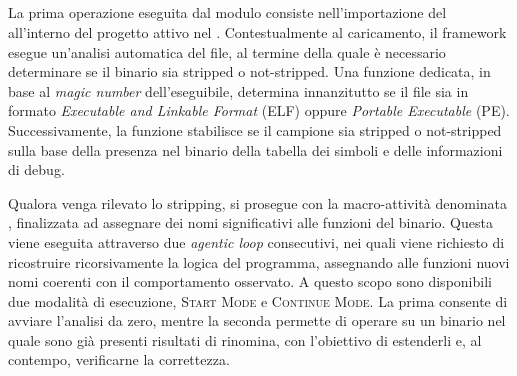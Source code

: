 \subsection{\sreagent{}} %

La prima operazione eseguita dal modulo consiste nell'importazione del \binary{} all'interno del progetto attivo nel \sreframework{}. Contestualmente al caricamento, il framework esegue un'analisi automatica del file, al termine della quale è necessario determinare se il binario sia stripped o not-stripped. Una funzione dedicata, in base al \emph{magic number} dell'eseguibile, determina innanzitutto se il file sia in formato \emph{Executable and Linkable Format} (ELF) oppure \emph{Portable Executable} (PE). Successivamente, la funzione stabilisce se il campione sia stripped o not-stripped sulla base della presenza nel binario della tabella dei simboli e delle informazioni di debug.



Qualora venga rilevato lo stripping, si prosegue con la macro-attività denominata \renaming{}, finalizzata ad assegnare dei nomi significativi alle funzioni del binario. Questa viene eseguita attraverso due \emph{agentic loop} consecutivi, nei quali viene richiesto di ricostruire ricorsivamente la logica del programma, assegnando alle funzioni nuovi nomi coerenti con il comportamento osservato. A questo scopo sono disponibili due modalità di esecuzione, \textsc{Start Mode} e \textsc{Continue Mode}. La prima consente di avviare l'analisi da zero, mentre la seconda permette di operare su un binario nel quale sono già presenti risultati di rinomina, con l'obiettivo di estenderli e, al contempo, verificarne la correttezza.

